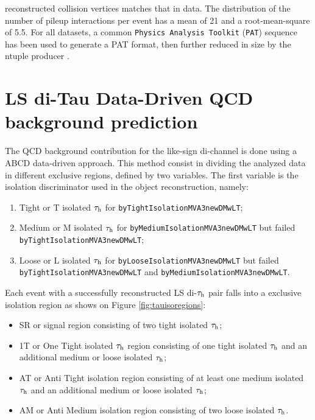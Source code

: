 reconstructed collision vertices matches that in data. The distribution of the number of pileup interactions per event has a mean of 21 and a root-mean-square of 5.5. For all datasets, a common \texttt{Physics Analysis Toolkit} (\texttt{PAT}) \cite{Adam:2010zza} sequence has been used to generate a PAT format, then further reduced in size by the ntuple producer \cite{bib:thentuplemaker}.

\section {LS di-Tau Data-Driven QCD background prediction} \label{sec:bgestimation}

The QCD background contribution for the like-sign di-\hadtau channel is done using a ABCD data-driven approach. This method consist in  dividing the analyzed data in different exclusive regions, defined by two variables. The first variable is the \hadtau isolation discriminator used in the object reconstruction, namely:
 	
 	\begin{enumerate}
 		\item Tight or T isolated $\tau_{\text{h}}$ for \texttt{byTight\-IsolationMVA3newDMwLT};
 		\item Medium or M isolated $\tau_{\text{h}}$ for \texttt{byMedium\-IsolationMVA3newDMwLT} but failed \texttt{byTight\-IsolationMVA3newDMwLT};
 		\item Loose or L isolated $\tau_{\text{h}}$  for \texttt{byLoose\-IsolationMVA3newDMwLT} but failed \texttt{byTight\-IsolationMVA3newDMwLT} and \texttt{byMedium\-IsolationMVA3newDMwLT}.
 	\end{enumerate}
 	
Each event with a successfully reconstructed LS di-$\tau_{\text{h}}$ pair falls into a exclusive isolation region as shows on Figure \ref{fig:tauisoregions}:
 	
 	\begin{itemize}
 		\item SR or signal region consisting of two tight isolated $\tau_{\text{h}}$;
 		\item 1T or One Tight isolated $\tau_{\text{h}}$ region consisting of one tight isolated $\tau_{\text{h}}$ and an additional medium or loose isolated $\tau_{\text{h}}$;
 		\item AT or Anti Tight isolation region consisting of at least one medium isolated $\tau_{\text{h}}$ and an additional medium or loose isolated $\tau_{\text{h}}$;
 		\item AM or Anti Medium isolation region consisting of two loose isolated $\tau_{\text{h}}$.
 	\end{itemize}
 
